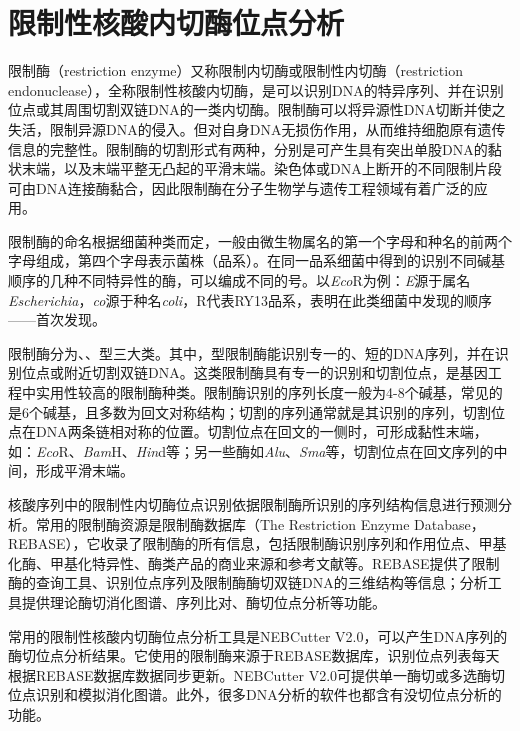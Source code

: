 \section{限制性核酸内切酶位点分析}
限制酶（restriction enzyme）又称限制内切酶或限制性内切酶（restriction endonuclease），全称限制性核酸内切酶，是可以识别DNA的特异序列、并在识别位点或其周围切割双链DNA的一类内切酶。限制酶可以将异源性DNA切断并使之失活，限制异源DNA的侵入。但对自身DNA无损伤作用，从而维持细胞原有遗传信息的完整性。限制酶的切割形式有两种，分别是可产生具有突出单股DNA的黏状末端，以及末端平整无凸起的平滑末端。染色体或DNA上断开的不同限制片段可由DNA连接酶黏合，因此限制酶在分子生物学与遗传工程领域有着广泛的应用。

限制酶的命名根据细菌种类而定，一般由微生物属名的第一个字母和种名的前两个字母组成，第四个字母表示菌株（品系）。在同一品系细菌中得到的识别不同碱基顺序的几种不同特异性的酶，可以编成不同的号。以\textit{Eco}R为例：\textit{E}源于属名\textit{Escherichia}，\textit{co}源于种名\textit{coli}，R代表RY13品系，表明在此类细菌中发现的顺序——首次发现。

限制酶分为、、型三大类。其中，型限制酶能识别专一的、短的DNA序列，并在识别位点或附近切割双链DNA。这类限制酶具有专一的识别和切割位点，是基因工程中实用性较高的限制酶种类。限制酶识别的序列长度一般为4-8个碱基，常见的是6个碱基，且多数为回文对称结构；切割的序列通常就是其识别的序列，切割位点在DNA两条链相对称的位置。切割位点在回文的一侧时，可形成黏性末端，如：\textit{Eco}R、\textit{Bam}H、\textit{Hin}d等；另一些酶如\textit{Alu}、\textit{Sma}等，切割位点在回文序列的中间，形成平滑末端。

核酸序列中的限制性内切酶位点识别依据限制酶所识别的序列结构信息进行预测分析。常用的限制酶资源是限制酶数据库（The Restriction Enzyme Database，REBASE），它收录了限制酶的所有信息，包括限制酶识别序列和作用位点、甲基化酶、甲基化特异性、酶类产品的商业来源和参考文献等。REBASE提供了限制酶的查询工具、识别位点序列及限制酶酶切双链DNA的三维结构等信息；分析工具提供理论酶切消化图谱、序列比对、酶切位点分析等功能。

常用的限制性核酸内切酶位点分析工具是NEBCutter V2.0，可以产生DNA序列的酶切位点分析结果。它使用的限制酶来源于REBASE数据库，识别位点列表每天根据REBASE数据库数据同步更新。NEBCutter V2.0可提供单一酶切或多选酶切位点识别和模拟消化图谱。此外，很多DNA分析的软件也都含有没切位点分析的功能。

